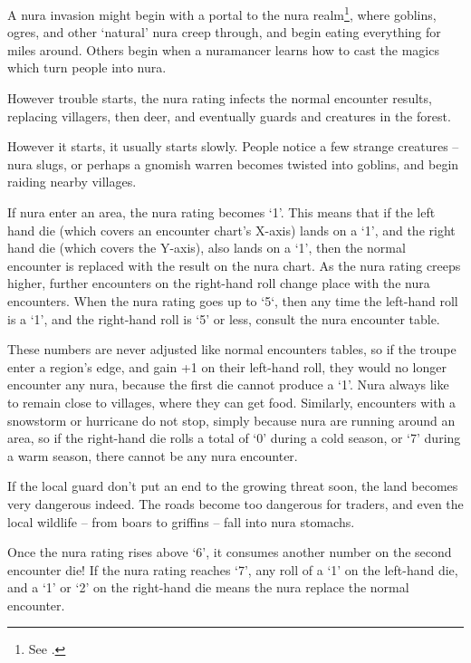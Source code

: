 \begin{multicols}{2}

\noindent
A nura invasion might begin with a portal to the nura realm\footnote{See .}, where goblins, ogres, and other `natural' nura creep through, and begin eating everything for miles around.
Others begin when a nuramancer learns how to cast the magics which turn people into nura.

However trouble starts, the nura rating infects the normal encounter results, replacing villagers, then deer, and eventually \glspl{guard} and creatures in the forest.

However it starts, it usually starts slowly.
People notice a few strange creatures -- nura slugs, or perhaps a gnomish warren becomes twisted into goblins, and begin raiding nearby villages.

If nura enter an area, the nura rating becomes `1'.
This means that if the left hand die (which covers an encounter chart's X-axis) lands on a `1', and the right hand die (which covers the Y-axis), also lands on a `1', then the normal encounter is replaced with the result on the nura chart.
As the nura rating creeps higher, further encounters on the right-hand roll change place with the nura encounters.
When the nura rating goes up to `5`, then any time the left-hand roll is a `1', and the right-hand roll is `5' or less, consult the nura encounter table.

These numbers are never adjusted like normal encounters tables, so if the troupe enter a region's \gls{edge}, and gain +1 on their left-hand roll, they would no longer encounter any nura, because the first die cannot produce a `1'.
Nura always like to remain close to villages, where they can get food.
Similarly, encounters with a snowstorm or hurricane do not stop, simply because nura are running around an area, so if the right-hand die rolls a total of `0' during a cold season, or `7' during a warm season, there cannot be any nura encounter.

If the local \gls{guard} don't put an end to the growing threat soon, the land becomes very dangerous indeed.
The roads become too dangerous for traders, and even the local wildlife -- from boars to griffins -- fall into nura stomachs.

Once the nura rating rises above `6', it consumes another number on the second encounter die!
If the nura rating reaches `7', any roll of a `1' on the left-hand die, and a `1' or `2' on the right-hand die means the nura replace the normal encounter.


\end{multicols}
